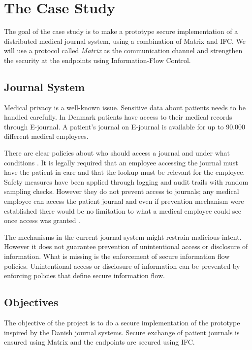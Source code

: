 \section{The Case Study}

The goal of the case study is to make a prototype secure implementation of a distributed medical journal system, using a combination of Matrix and IFC. We will use a protocol called \emph{Matrix} as the communication channel and strengthen the security at the endpoints using Information-Flow Control.


\subsection{Journal System}\label{journalintro}

Medical privacy is a well-known issue\cite{Rahim2013}. Sensitive data about patients needs to be handled carefully. In Denmark patients have access to their medical records through E-journal\cite{ejournal}. A patient's journal on E-journal is available for up to 90.000 different medical employees\cite{JP90000}. 

There are clear policies about who should access a journal and under what conditions . It is legally required that an employee accessing the journal must have the patient in care and that the lookup must be relevant for the employee. Safety measures have been applied through logging and audit trails with random sampling checks. However they do not prevent access to journals; any medical employee can access the patient journal and even if prevention mechanism were established there would be no limitation to what a medical employee could see once access was granted \cite{adgang}\cite{kontrol}. 

The mechanisms in the current journal system might restrain malicious intent. However it does not guarantee prevention of unintentional access or disclosure of information\cite{Harman2012}. 
What is missing is the enforcement of secure information flow policies. Unintentional access or disclosure of information can be prevented by enforcing policies that define secure information flow.


\subsection{Objectives} 
The objective of the project is to do a secure implementation of the prototype inspired by the Danish journal systems. Secure exchange of patient journals is ensured using Matrix and the endpoints are secured using IFC.

